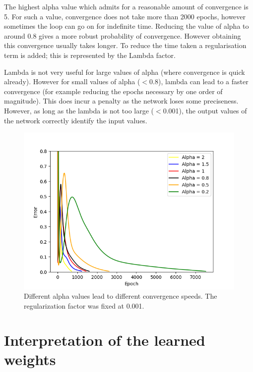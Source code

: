 \documentclass[a4paper]{article}
\begin{document}
The highest alpha value which admits for a reasonable amount of convergence is 5. For such a value, convergence does not take more than 2000 epochs, however sometimes the loop can go on for indefinite time. Reducing the value of alpha to around 0.8 gives a  more robust probability of  convergence. However obtaining this convergence usually takes longer. To reduce the time taken a regularisation term is added; this is represented by the Lambda factor.

Lambda is not very useful for large values of alpha (where convergence is quick already). However for small values of alpha ($<$0.8), lambda can lead to a faster convergence (for example reducing the epochs necessary by one order of magnitude). This does incur a penalty as the network loses some preciseness. However, as long as the lambda is not too large ($<$0.001), the output values of the network correctly identify the input values.

\begin{figure}
\includegraphics[scale=0.8]{learning_rate}
\caption{Different alpha values lead to different convergence speeds. The regularization factor was fixed at 0.001.}
\end{figure}



\section{Interpretation of the learned weights}
\end{document}
